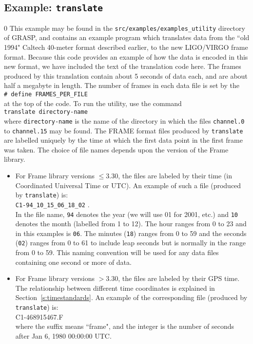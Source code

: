 \subsection{Example: {\tt translate}}
\label{ss:translate}
\setcounter{equation}0
This example may be found in the {\tt src/examples/examples\_utility} directory of
GRASP, and contains an example program which translates data from the
``old 1994" Caltech 40-meter format described earlier, to the new
LIGO/VIRGO frame format.  Because this code provides an example of how
the data is encoded in this new format, we have included the text of
the translation code here.  The frames produced by this
translation contain about 5 seconds of data each, and are about half a
megabyte in length.  The number of frames in each data file is set by the\\
{\tt \# define FRAMES\_PER\_FILE}\\
at the top of the code.
To run the utility, use the command\\
{\tt translate directory-name}\\
where {\tt directory-name} is the name of the directory in which
the files {\tt channel.0} to {\tt channel.15} may be found.
The FRAME format files produced by {\tt translate} are labelled uniquely
by the time at which the first data point in the first frame was taken.
The choice of file names depends upon the version of the Frame library.
\begin{itemize}
\item
  For Frame library versions $\le 3.30$, the files are labeled by their time
(in Coordinated Universal Time or UTC).  An example of such a file (produced
by {\tt translate}) is:\\
{\tt C1-94\_10\_15\_06\_18\_02} .\\
In the file name, {\tt 94}
denotes the year (we will use 01 for 2001, etc.) and {\tt 10} denotes
the month (labelled from 1 to 12).  The hour ranges from 0 to 23 and in
this examples is {\tt 06}.  The minutes ({\tt 18}) ranges from 0 to 59
and the seconds ({\tt 02}) ranges from 0 to 61 to include leap seconds
but is normally in the range from 0 to 59.  This naming convention will
be used for any data files containing one second or more of data.
\item
For Frame library versions $ > 3.30$, the files are labeled by their GPS time.
The relationship between different time coordinates is explained in Section~\ref{s:timestandards}.
An example of the corresponding file (produced
by {\tt translate}) is:\\
C1-468915467.F\\
where the suffix means ``frame", and the integer is the number of seconds
after Jan 6, 1980 00:00:00 UTC.
\end{itemize}
